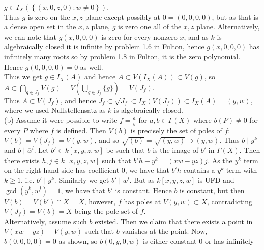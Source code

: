 \documentclass[a4paper]{article}
\begin{document}
$g \in I_X \left( \left\{ \left( x, 0, z, 0 \right)  \colon w\neq 0 \right\}
\right) $.\\
Thus $g$ is zero on the $x,z$ plane except possibly at $0 = (0,0,0,0)$, but as
that is a dense open set in the $x,z$ plane, $g$ is zero one all of the $x,z$
plane. Alternatively, we can note that
$g(x,0,0,0)$ is zero for every nonzero $x$, and as $k$ is algebraically closed
it is infinite by problem 1.6 in Fulton, hence $g(x,0,0,0)$ has infinitely many
roots so by problem 1.8 in Fulton, it is the zero polynomial. Hence $g(0,0,0,0)
= 0$ as well.\\
Thus we get
$g \in I_X (A)$ and hence $A \subset V \left( I_X \left( A \right)  \right) 
\subset V(g)$, so $A \subset \bigcap_{g \in J_f} V(g) = 
V\left( \bigcup_{g \in J_f} \{g\} \right) = V\left( J_f \right) $.\\
\linebreak
Thus $A \subset V(J_f)$, and hence $J_f 
\subset \sqrt{J_f} \subset I_X \left( V\left( J_f \right)  \right) 
\subset I_X(A) = \left( \overline{y}, \overline{w} \right) $,
where we used Nullstellensatz as $k$ is algebraically closed.\\
\linebreak
(b) Assume it were possible to write $f = \frac{a}{b}$ for $a,b \in \Gamma(X)$
where
$b (P) \neq 0$ for every $P$ where $f$ is defined. Then
$V(b)$ is precisely the set of poles of $f$: $V(b) = V\left( J_f \right)
= V\left( \overline{y}, \overline{w} \right) $, and
so $\sqrt{\left( b \right) } = \sqrt{\left( \overline{y},\overline{w} \right)
} \supset (\overline{y}, \overline{w})$. Thus $b  \mid \overline{y}^{k}$ and $b
\mid \overline{w}^{l}$. Let $b' \in k\left[ x,y,z,w \right] $ be such that $b$ is the image of $b'$ in
$\Gamma(X)$. Then there exists $h,j \in k\left[ x,y,z,w \right] $  such that
$b' h - y^{k} = (xw-yz) j$. As the $y^{k}$ term on the right hand side has
coefficient $0$, we have that $b'h$ contains a $y^{k}$ term with $k\ge 1$, i.e.
$b'  \mid y^{k}$. Similarly we get $b'  \mid w^{l}$.
But as $k\left[ x,y,z,w \right] $ is UFD and $\gcd(y^{k},w^{l}) = 1$, we have
that $b'$ is constant. Hence $b$ is constant, but then
$V(b) = V(b') \cap X = X$, however, $f$ has poles at
 $V(y,w) \subset X$, contradicting $V(J_f) = V(b) = X$ being the pole set of
 $f$.\\
 Alternatively,
 assume such $b$ existed. Then we claim that there exists a point in
  $V(xw-yz) - V(y,w)$ such that $b$ vanishes at the point. Now,
  $b(0,0,0,0) = 0$ as shown, so $b(0,y,0,w)$ is either constant $0$ or has infinitely
\end{document}
